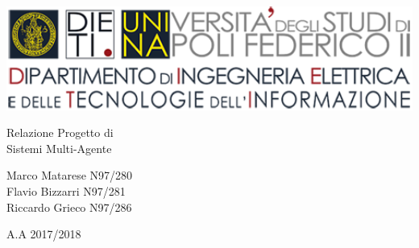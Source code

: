 
\thispagestyle{empty}

\begin{center}
	\includegraphics[width=1\textwidth]{DIETI}
	
	\par\bigskip\par\bigskip\par\bigskip\par\bigskip\par\bigskip\par\bigskip\par\bigskip\par	%
	
	{\huge Relazione Progetto di\\}
	{\huge Sistemi Multi-Agente\\}
	
	\par\bigskip\par\bigskip\par\bigskip\par\bigskip\par\bigskip\par\bigskip\par\bigskip\par	%
	
	{\LARGE Marco Matarese N97/280\\}
	{\LARGE Flavio Bizzarri N97/281\\}
	{\LARGE Riccardo Grieco N97/286\\}
	
	\par\bigskip\par\bigskip\par\bigskip\par\bigskip\par\bigskip\par\bigskip	%
	
	{\large A.A 2017/2018\par}
	
\end{center}

